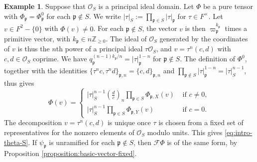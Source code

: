 \documentclass[reqno]{amsart}
\newcommand{\qr}[2]{\left( \frac{#1}{#2} \right)}
\theoremstyle{plain}
\theoremstyle{definition}
\newtheorem{example}[theorem]{Example}
\theoremstyle{itplain}
\numberwithin{equation}{section}
\numberwithin{theorem}{section}
\begin{document}
\begin{example}\label{example:S-arithmetic}
  Suppose that $\mathcal{O}_S$ is a principal ideal domain.  Let $\Phi$ be a pure tensor with $\Phi_{\mathfrak{p}} = \Phi_{\mathfrak{p}}^0$ for each $\mathfrak{p} \notin S$.  We write $\lvert \tau \rvert_S := \prod_{\mathfrak{p} \in S} \lvert \tau \rvert_{\mathfrak{p}}$ for $\tau \in F^\times$.  Let $v \in F^2 - \{0\}$ with $\Phi(v) \neq 0$.  For each $\mathfrak{p} \notin S$, the vector $v$ is then $\varpi_{\mathfrak{p}}^{k_{\mathfrak{p}}}$ times a primitive vector, with $k_{\mathfrak{p}} \in n \mathbb{Z}_{\geq 0}$.  The ideal of $\mathcal{O}_S$ generated by the coordinates of $v$ is thus the $n$th power of a principal ideal $\tau \mathcal{O}_S$, and $v = \tau^n (c, d)$ with $c, d \in \mathcal{O}_S$ coprime.  We have $q_{\mathfrak{p}}^{(n-1) k_{\mathfrak{p}} / n} = \lvert \tau \rvert_{\mathfrak{p}}^{1-n}$ for $\mathfrak{p} \notin S$.  The definition of $\Phi^0$, together with the identities $\{\tau^n c, \tau^n d\}_{\mathfrak{p}, n} = \{c, d\}_{\mathfrak{p}, n}$ and $\prod_{\mathfrak{p} \notin S} \lvert \tau \rvert_{\mathfrak{p}}^{1-n} = \lvert \tau \rvert_S^{n-1}$, thus gives
  \begin{equation*}
    \Phi(v) =
    \begin{cases}
      \lvert \tau \rvert_S^{n-1} \qr{d}{c}_n \prod_{\mathfrak{p} \in S} \Phi_{\mathfrak{p}, X}(v) & \text{ if } c \neq 0, \\
      \lvert \tau \rvert_S^{n-1} \prod_{\mathfrak{p} \in S} \Phi_{\mathfrak{p}, Y}(v) & \text{ if } c = 0.
    \end{cases}
  \end{equation*}
  The decomposition $v = \tau^n (c, d)$ is unique once $\tau$ is chosen from a fixed set of representatives for the nonzero elements of $\mathcal{O}_S$ modulo units.  This gives \eqref{eq:intro-theta-S}.  If $\psi_{\mathfrak{p}}$ is unramified for each $\mathfrak{p} \notin S$, then $\mathcal{F} \Phi$ is of the same form, by Proposition \ref{proposition:basic-vector-fixed}.
\end{example}
\end{document}
